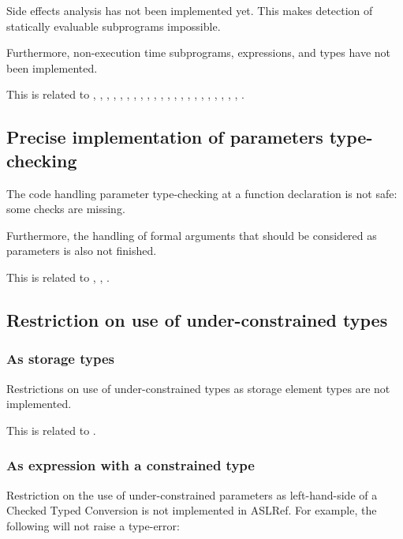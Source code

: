 \documentclass{book}
\begin{document}
Side effects analysis has not been implemented yet.
%
This makes detection of statically evaluable subprograms impossible.

Furthermore, non-execution time subprograms, expressions, and types have not
been implemented.

This is related to , , , ,
, , , , ,
, , , , ,
, , , , ,
, , , .

\subsection{Precise implementation of parameters type-checking}

The code handling parameter type-checking at a function declaration is not
safe: some checks are missing.

Furthermore, the handling of formal arguments that should be considered as
parameters is also not finished.

This is related to , , .

\subsection{Restriction on use of under-constrained types}

\subsubsection{As storage types}
Restrictions on use of under-constrained types as storage element types are not
implemented.

This is related to .

\subsubsection{As expression with a constrained type}

Restriction on the use of under-constrained parameters as left-hand-side of a
Checked Typed Conversion is not implemented in ASLRef.
%
For example, the following will not raise a type-error:
\end{document}
